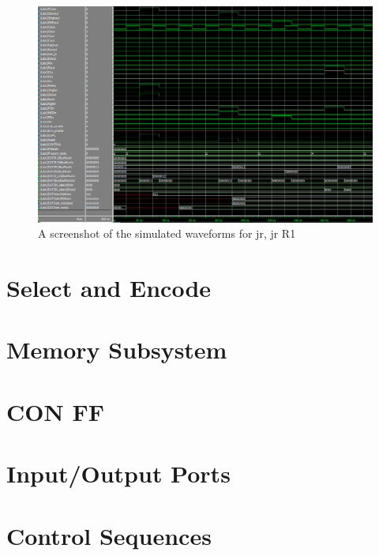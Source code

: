 \documentclass{article}
\begin{document}
        \begin{figure}[h!]
            \begin{center}
                \includegraphics[width=15cm]{jr_wave.png}
                \caption{A screenshot of the simulated waveforms for jr, jr R1}
            \end{center}
        \end{figure}


\appendix
\section{Select and Encode}
     \label{TB_select_and_encode.v}
\section{Memory Subsystem}
     \label{ram.v}
     \label{MAR.v}
     \label{MDR.v}
\section{CON FF}
     \label{con_ff.v}
     \label{ALU.v}
\section{Input/Output Ports}
     \label{inputPort.v}
     \label{outputPort.v}

\section{Control Sequences}
\end{document}
